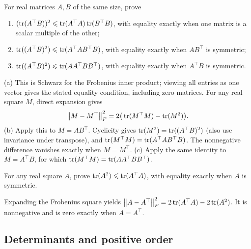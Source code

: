 \begin{problem}\label{ex:12:ineq-ma-05}
For real matrices \(A,B\) of the same size, prove
\begin{enumerate}
\item \((\operatorname{tr}(A^\top B))^2\leqslant\operatorname{tr}(A^\top A)\operatorname{tr}(B^\top B)\),
with equality exactly when one matrix is a scalar multiple of the other;
\item \(\operatorname{tr}((A^\top B)^2)\leqslant\operatorname{tr}(A^\top AB^\top B)\),
with equality exactly when \(AB^\top\) is symmetric;
\item \(\operatorname{tr}((A^\top B)^2)\leqslant\operatorname{tr}(AA^\top BB^\top)\),
with equality exactly when \(A^\top B\) is symmetric.
\end{enumerate}
\end{problem}
\begin{solution}
(a) This is Schwarz for the Frobenius inner product; viewing all entries
as one vector gives the stated equality condition, including zero matrices.
For any real square \(M\), direct expansion gives
\[
\left\lVert M-M^\top\right\rVert_F^2=2\big(\operatorname{tr}(M^\top M)-\operatorname{tr}(M^2)\big).
\]
(b) Apply this to \(M=AB^\top\). Cyclicity gives
\(\operatorname{tr}(M^2)=\operatorname{tr}((A^\top B)^2)\) (also use invariance under transpose),
and \(\operatorname{tr}(M^\top M)=\operatorname{tr}(A^\top AB^\top B)\).
The nonnegative difference vanishes exactly when \(M=M^\top\).
(c) Apply the same identity to \(M=A^\top B\), for which
\(\operatorname{tr}(M^\top M)=\operatorname{tr}(AA^\top BB^\top)\).
\end{solution}

\begin{problem}\label{ex:12:ineq-ma-06}
For any real square \(A\), prove \(\operatorname{tr}(A^2)\leqslant\operatorname{tr}(A^\top A)\),
with equality exactly when \(A\) is symmetric.
\end{problem}
\begin{solution}
Expanding the Frobenius square yields
\(\left\lVert A-A^\top\right\rVert_F^2=2\operatorname{tr}(A^\top A)-2\operatorname{tr}(A^2)\).
It is nonnegative and is zero exactly when \(A=A^\top\).
\end{solution}

\subsection*{Determinants and positive order}

